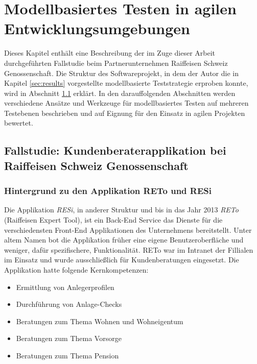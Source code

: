 \chapter{Modellbasiertes Testen in agilen Entwicklungsumgebungen}
\label{sec:problemdescription}

Dieses Kapitel enthält eine Beschreibung der im Zuge dieser Arbeit durchgeführten Fallstudie beim Partnerunternehmen Raiffeisen Schweiz Genossenschaft. Die Struktur des Softwareprojekt, in dem der Autor die in Kapitel \ref{sec:results}  vorgestellte modellbasierte Teststrategie erproben konnte, wird in Abschnitt \ref{sec:fallstudie} erklärt. In den darauffolgenden Abschnitten werden verschiedene Ansätze und Werkzeuge für modellbasiertes Testen auf mehreren Testebenen beschrieben und auf Eignung für den Einsatz in agilen Projekten bewertet.

\section{Fallstudie: Kundenberaterapplikation bei Raiffeisen Schweiz Genossenschaft}

\label{sec:fallstudie}
\subsection{Hintergrund zu den Applikation RETo und RESi}
Die Applikation \textit{RESi}, in anderer Struktur und bis in das Jahr 2013 \textit{RETo} (Raiffeisen Expert Tool), ist ein \Gls{Back-End} Service das Dienste für die verschiedensten \Gls{Front-End} Applikationen des Unternehmens bereitstellt. Unter altem Namen bot die Applikation früher eine eigene Benutzeroberfläche und weniger, dafür spezifischere, Funktionalität. RETo war im Intranet der Fillialen im Einsatz und wurde ausschließlich für Kundenberatungen eingesetzt. Die Applikation hatte folgende Kernkompetenzen:

\begin{itemize}
\item Ermittlung von Anlegerprofilen
\item Durchführung von Anlage-Checks
\item Beratungen zum Thema Wohnen und Wohneigentum
\item Beratungen zum Thema Vorsorge
\item Beratungen zum Thema Pension
\end{itemize}


